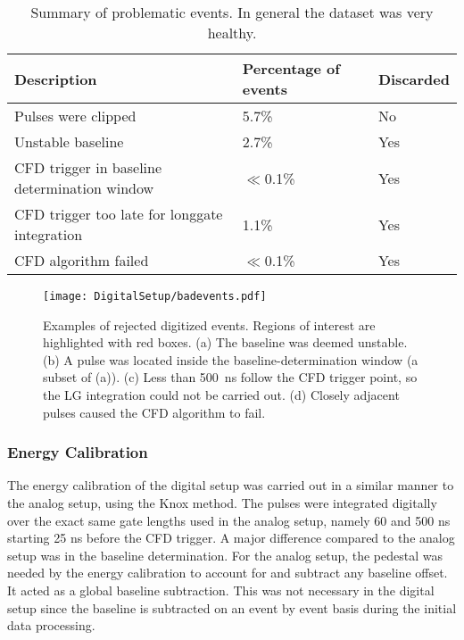 \documentclass[main.tex]{subfiles}
\begin{document}
\begin{table}[]
\begin{tabular}{|l|l|l|}
\hline
Description                          & Percentage of events & Discarded \\ \hline
Pulses were clipped                           & 5.7\%                          & No                 \\ \hline
Unstable baseline                             & 2.7\%                        & Yes                \\ \hline
CFD trigger in baseline determination window  & $\ll$0.1\%                      & Yes                \\ \hline
CFD trigger too late for longgate integration & 1.1\%                         & Yes                \\ \hline
CFD algorithm failed                          & $\ll$0.1\%                    & Yes                \\ \hline

\end{tabular}
\caption[Summary of problematic events.]{Summary of problematic events. In general the dataset was very healthy.}
\label{tab:badevents}
\end{table}

\begin{figure}[ht!]
    \centering
        \texttt{[image: DigitalSetup/badevents.pdf]}
        \caption[Examples of rejected digitized events]{Examples of rejected digitized events. Regions of interest are highlighted with red boxes. (a) The baseline was deemed unstable. (b) A pulse was located inside the baseline-determination window (a subset of (a)). (c) Less than \SI{500}{ns} follow the CFD trigger point, so the LG integration could not be carried out. (d) Closely adjacent pulses caused the CFD algorithm to fail.}
    \label{fig:badevents} 
\end{figure}
\newpage
\subsubsection{Energy Calibration}\label{sec:Ecal_D}
The energy calibration of the digital setup was carried out in a similar manner to the analog setup, using the Knox method. The pulses were integrated digitally over the exact same gate lengths used in the analog setup, namely 60 and 500 ns starting 25 ns before the CFD trigger. A major difference compared to the analog setup was in the baseline determination. For the analog setup, the pedestal was needed by the energy calibration to account for and subtract any baseline offset. It acted as a global baseline subtraction. This was not necessary in the digital setup since the baseline is subtracted on an event by event basis during the initial data processing. 
\end{document}
